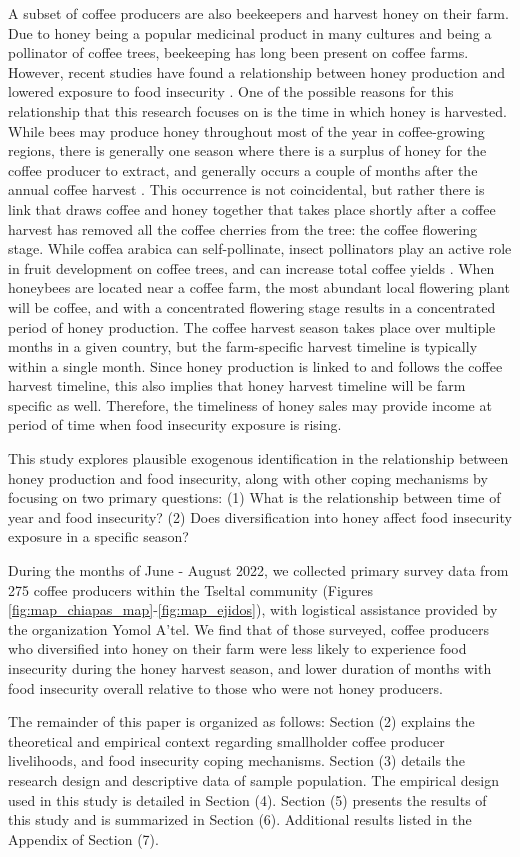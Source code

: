 \documentclass[../main.tex]{subfiles}
\begin{document}
A subset of coffee producers are also beekeepers and harvest honey on their farm. Due to honey being a popular medicinal product in many cultures and being a pollinator of coffee trees, beekeeping has long been present on coffee farms. However, recent studies have found a relationship between honey production and lowered exposure to food insecurity \parencite{anderzen_effects_2020}. One of the possible reasons for this relationship that this research focuses on is the time in which honey is harvested. While bees may produce honey throughout most of the year in coffee-growing regions, there is generally one season where there is a surplus of honey for the coffee producer to extract, and generally occurs a couple of months after the annual coffee harvest \parencite{martello_use_2022}. This occurrence is not coincidental, but rather there is link that draws coffee and honey together that takes place shortly after a coffee harvest has removed all the coffee cherries from the tree: the coffee flowering stage. While coffea arabica can self-pollinate, insect pollinators play an active role in fruit development on coffee trees, and can increase total coffee yields \parencite{hipolito_landscape_2018, khan_honey_2007}. When honeybees are located near a coffee farm, the most abundant local flowering plant will be coffee, and with a concentrated flowering stage results in a concentrated period of honey production. The coffee harvest season takes place over multiple months in a given country, but the farm-specific harvest timeline is typically within a single month. Since honey production is linked to and follows the coffee harvest timeline, this also implies that honey harvest timeline will be farm specific as well. Therefore, the timeliness of honey sales may provide income at period of time when food insecurity exposure is rising. 

This study explores plausible exogenous identification in the relationship between honey production and food insecurity, along with other coping mechanisms by focusing on two primary questions: (1) What is the relationship between time of year and food insecurity? (2) Does diversification into honey affect food insecurity exposure in a specific season?

During the months of June - August 2022, we collected primary survey data from 275 coffee producers within the Tseltal community (Figures \ref{fig:map_chiapas_map}-\ref{fig:map_ejidos}), with logistical assistance provided by the organization Yomol A’tel. We find that of those surveyed, coffee producers who diversified into honey on their farm were less likely to experience food insecurity during the honey harvest season, and lower duration of months with food insecurity overall relative to those who were not honey producers.

The remainder of this paper is organized as follows: Section (2) explains the theoretical and empirical context regarding smallholder coffee producer livelihoods, and food insecurity coping mechanisms. Section (3) details the research design and descriptive data of sample population. The empirical design used in this study is detailed in Section (4). Section (5) presents the results of this study and is summarized in Section (6). Additional results listed in the Appendix of Section (7).
\end{document}

